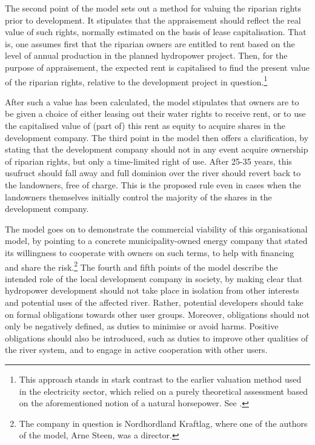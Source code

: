 The second point of the model sets out a method for valuing the riparian rights prior to development. It stipulates that the appraisement should reflect the real value of such rights, normally estimated on the basis of lease capitalisation. That is, one assumes first that the riparian owners are entitled to rent based on the level of annual production in the planned hydropower project. Then, for the purpose of appraisement, the expected rent is capitalised to find the present value of the riparian rights, relative to the development project in question.\footnote{This approach stands in stark contrast to the earlier valuation method used in the electricity sector, which relied on a purely theoretical assessment based on the aforementioned notion of a natural horsepower. See \cite{dyrkolbotn15,hellandsfoss97}.}

After such a value has been calculated, the model stipulates that owners are to be given a choice of either leasing out their water rights to receive rent, or to use the capitalised value of (part of) this rent as equity to acquire shares in the development company. The third point in the model then offers a clarification, by stating that the development company should not in any event acquire ownership of riparian rights, but only a time-limited right of use. After 25-35 years, this usufruct should fall away and full dominion over the river should revert back to the landowners, free of charge. 
This is the proposed rule even in cases when the landowners themselves initially control the majority of the shares in the development company. 

The model goes on to demonstrate the commercial viability of this organisational model, by pointing to a concrete municipality-owned energy company that stated its willingness to cooperate with owners on such terms, to help with financing and share the risk.\footnote{The company in question is Nordhordland Kraftlag, where one of the authors of the model, Arne Steen, was a director.}
The fourth and fifth points of the model describe the intended role of the local development company in society, by making clear that hydropower development should not take place in isolation from other interests and potential uses of the affected river. Rather, potential developers should take on formal obligations towards other user groups. Moreover, obligations should not only be negatively defined, as duties to minimise or avoid harms. Positive obligations should also be introduced, such as duties to improve other qualities of the river system, and to engage in active cooperation with other users.

